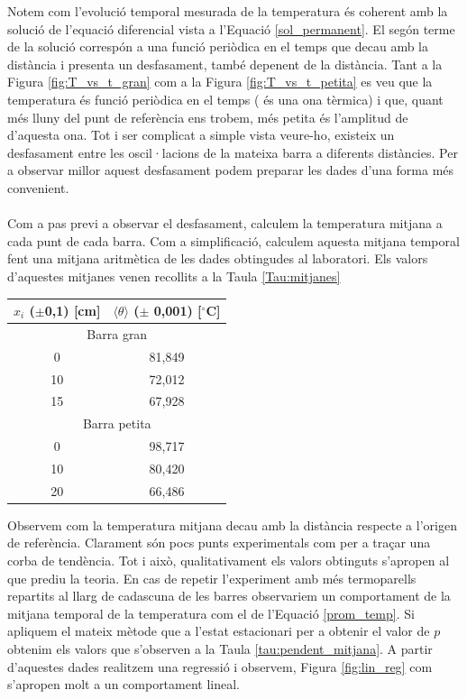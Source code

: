 \documentclass[12pt,twosides,onecolumn,openany]{article}
\newenvironment{Figura}
  {\par\medskip\noindent\minipage{\linewidth}}
  {\endminipage\par\medskip}
\begin{document}
\begin{multicols}{2}
\begin{Figura}
  \label{fig:T_vs_t_petita}
\end{Figura}
Notem com l'evolució temporal mesurada de la temperatura és coherent amb la solució de l'equació diferencial vista a l'Equació \eqref{sol_permanent}. El segón terme de la solució correspón a una funció periòdica en el temps que decau amb la distància i presenta un desfasament, també depenent de la distància. Tant a la Figura \ref{fig:T_vs_t_gran} com a la Figura \ref{fig:T_vs_t_petita} es veu que la temperatura és funció periòdica en el temps ( és una ona tèrmica) i que, quant més lluny del punt de referència ens trobem, més petita és l'amplitud de d'aquesta ona. Tot i ser complicat a simple vista veure-ho, existeix un desfasament entre les oscil·lacions de la mateixa barra a diferents distàncies. Per a observar millor aquest desfasament podem preparar les dades d'una forma més convenient.\\\\
Com a pas previ a observar el desfasament, calculem la temperatura mitjana a cada punt de cada barra. Com a simplificació, calculem aquesta mitjana temporal fent una mitjana aritmètica de les dades obtingudes al laboratori. Els valors d'aquestes mitjanes venen recollits a la Taula \ref{Tau:mitjanes}
\begin{Figura}
  \centering
  \begin{tabular}{c|c}
    $x_i$ ($\pm$0,1) [cm] & $\langle \theta \rangle$ ($\pm$ 0,001) [$^\circ$C]\\
    \hline 
    \multicolumn{2}{c}{Barra gran} \\ \hline
    0 & 81,849\\
    10 & 72,012\\
    15 & 67,928 \\ \hline
    \multicolumn{2}{c}{Barra petita} \\ \hline
    0 & 98,717\\
    10 & 80,420\\
    20 & 66,486 \\
  \end{tabular}
  \label{Tau:mitjanes}
\end{Figura}
Observem com la temperatura mitjana decau amb la distància respecte a l'origen de referència. Clarament són pocs punts experimentals com per a traçar una corba de tendència. Tot i això, qualitativament els valors obtinguts s'apropen al que prediu la teoria. En cas de repetir l'experiment amb més termoparells repartits al llarg de cadascuna de les barres observariem un comportament de la mitjana temporal de la temperatura com el de l'Equació \eqref{prom_temp}. Si apliquem el mateix mètode que a l'estat estacionari per a obtenir el valor de $p$ obtenim els valors que s'observen a la Taula \ref{tau:pendent_mitjana}. A partir d'aquestes dades realitzem una regressió i observem, Figura \ref{fig:lin_reg} com s'apropen molt a un comportament lineal.

\end{multicols}
\end{document}
